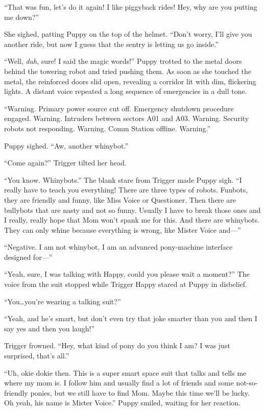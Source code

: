 ``That was fun, let's do it again! I like piggyback rides! Hey, why are you putting me down?''

She sighed, patting Puppy on the top of the helmet. ``Don't worry, I'll give you another ride, but now I guess that the sentry is letting us go inside.''

``Well, \emph{duh}, sure! I said the magic words!'' Puppy trotted to the metal doors behind the towering robot and tried pushing them. As soon as she touched the metal, the reinforced doors slid open, revealing a corridor lit with dim, flickering lights. A distant voice repeated a long sequence of emergencies in a dull tone.

{\mten ``Warning. Primary power source cut off. Emergency shutdown procedure engaged. Warning. Intruders between sectors A01 and A03. Warning. Security robots not responding. Warning. Comm Station offline. Warning.''}

Puppy sighed. ``Aw, another whinybot.''

``Come again?'' Trigger tilted her head.

``You know. Whinybots.'' The blank stare from Trigger made Puppy sigh. ``I really have to teach you everything! There are three types of robots. Funbots, they are friendly and funny, like Miss Voice or Questioner. Then there are bullybots that are nasty and not so funny. Usually I have to break those ones and I really, really hope that Mom won't spank me for this. And there are whinybots. They can only whine because everything is wrong, like Mister Voice and---''

{\mten ``Negative. I am not whinybot, I am an advanced pony-machine interface designed for---''}

``Yeah, sure, I was talking with Happy, could you please wait a moment?'' The voice from the suit stopped while Trigger Happy stared at Puppy in disbelief.

``You\dots you're wearing a talking suit?''

``Yeah, and he's smart, but don't even try that joke smarter than you and then I say yes and then you laugh!''

Trigger frowned. ``Hey, what kind of pony do you think I am? I was just surprised, that's all.''

``Uh, okie dokie then. This is a super smart space suit that talks and tells me where my mom is. I follow him and usually find a lot of friends and some not-so-friendly ponies, but we still have to find Mom. Maybe this time we'll be lucky. Oh yeah, his name is Mister Voice.'' Puppy smiled, waiting for her reaction.

